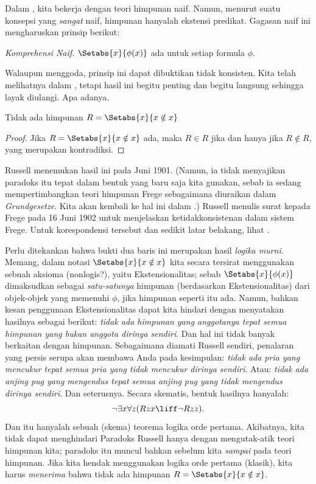 \documentclass[../../../include/open-logic-section]{subfiles}
\begin{document}

Dalam , kita bekerja dengan teori himpunan naif. Namun,
menurut suatu konsepsi yang \emph{sangat} naif, himpunan hanyalah ekstensi
predikat. Gagasan naif ini mengharuskan prinsip berikut:

\begin{defish}
  \emph{Komprehensi Naif.} $\Setabs{x}{\phi(x)}$ ada untuk setiap formula $\phi$.
\end{defish}

Walaupun menggoda, prinsip ini dapat dibuktikan tidak konsisten. Kita telah
melihatnya dalam , tetapi hasil ini begitu penting
dan begitu langsung sehingga layak diulangi. Apa adanya.

\begin{thm}
Tidak ada himpunan $R = \Setabs{x}{x \notin x}$
\end{thm}

\begin{proof}
Jika $R = \Setabs{x}{x \notin x}$ ada, maka
$R \in R$ jika dan hanya jika $R \notin R$, yang merupakan kontradiksi.
\end{proof}

Russell menemukan hasil ini pada Juni 1901. (Namun, ia tidak menyajikan
paradoks itu tepat dalam bentuk yang baru saja kita gunakan, sebab ia sedang
mempertimbangkan teori himpunan Frege sebagaimana diuraikan dalam
\emph{Grundgesetze}. Kita akan kembali ke hal ini dalam .)
Russell menulis surat kepada Frege pada 16 Juni 1902 untuk menjelaskan
ketidakkonsistenan dalam sistem Frege. Untuk korespondensi tersebut dan
sedikit latar belakang, lihat \citet[pp.~124--8]{Heijenoort1967}.

Perlu ditekankan bahwa bukti dua baris ini merupakan hasil \emph{logika
murni}. Memang, dalam notasi $\Setabs{x}{x \notin x}$ kita secara tersirat
menggunakan sebuah aksioma (nonlogis?), yaitu Ekstensionalitas; sebab
$\Setabs{x}{\phi(x)}$ dimaksudkan sebagai \emph{satu-satunya} himpunan
(berdasarkan Ekstensionalitas) dari objek-objek yang memenuhi $\phi$, jika
himpunan seperti itu ada. Namun, bahkan kesan penggunaan Ekstensionalitas
dapat kita hindari dengan menyatakan hasilnya sebagai berikut:
\emph{tidak ada himpunan yang anggotanya tepat semua himpunan yang bukan
anggota dirinya sendiri}. Dan hal ini tidak banyak berkaitan dengan himpunan.
Sebagaimana diamati Russell sendiri, penalaran yang persis serupa akan
membawa Anda pada kesimpulan: \emph{tidak ada pria yang mencukur tepat semua
pria yang tidak mencukur dirinya sendiri}. Atau: \emph{tidak ada anjing pug
yang mengendus tepat semua anjing pug yang tidak mengendus dirinya sendiri}.
Dan seterusnya. Secara skematis, bentuk hasilnya hanyalah:
\[
\lnot \exists x \forall z(Rzx \liff \lnot R zz).
\]
Dan itu hanyalah sebuah (skema) teorema logika orde pertama. Akibatnya, kita
tidak dapat menghindari Paradoks Russell hanya dengan mengutak-atik teori
himpunan kita; paradoks itu muncul bahkan sebelum kita \emph{sampai} pada
teori himpunan. Jika kita hendak menggunakan logika orde pertama (klasik),
kita harus \emph{menerima} bahwa tidak ada himpunan
$R = \Setabs{x}{x\notin x}$.
\end{document}
